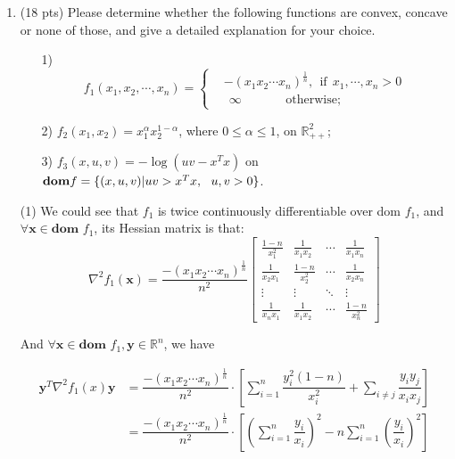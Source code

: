 \documentclass[10pt]{article}
\renewcommand{\mathbf}{\boldsymbol}
\begin{document}
\begin{enumerate}
\newpage

\item {\color{red} (18 pts)} Please determine whether the following functions are convex, concave or none of those, and give a detailed explanation for your choice.
\begin{itemize}
    \item[1)] 
     \begin{equation*}
     f_1(x_1,x_2,\cdots,x_n)=
      \begin{cases}
         &-(x_1x_2\cdots x_n)^{\frac{1}n},~~ \text{if}~~x_1,\cdots,x_n>0\\
         &~~\infty ~~~~~~~~~~~~~~~~\text{otherwise};\
       \end{cases}
     \end{equation*}
    \item[2)] $f_2(x_1,x_2)= x_1^\alpha x_2^{1-\alpha}$, where $0\leq\alpha\leq1$, on $\mathbb{R}_{++}^2$;
    \item[3)] $f_3(x,u,v)=-\log(uv-x^Tx)$ on ${\bf dom} f =\{(x,u,v)|uv>x^Tx,~~u,v>0\}$.
\end{itemize}


(1) We could see that $f_1$ is twice continuously differentiable over dom $f_1$, and $\forall\mathbf{x}\in\textbf{dom } f_1$, its Hessian matrix is that:
$$
\nabla^2 f_1(\mathbf{x})=\dfrac{-(x_1x_2\cdots x_n)^{\frac{1}{n}}}{n^2}\left[\begin{array}{cccc}
\frac{1-n}{x_1^2} & \frac{1}{x_1 x_2} & \cdots & \frac{1}{x_1 x_n} \\
\frac{1}{x_2 x_1} & \frac{1-n}{x_2^2} & \cdots & \frac{1}{x_2 x_n} \\
\vdots & \vdots & \ddots & \vdots \\
\frac{1}{x_n x_1} & \frac{1}{x_1 x_2} & \cdots & \frac{1-n}{x_n^2}
\end{array}\right]
$$

And $\forall \mathbf{x}\in\textbf{dom } f_1,\mathbf{y}\in\mathbb{R}^n$, we have

\begin{align*}
    \mathbf{y}^T\nabla^2 f_1(x)\mathbf{y} &= \dfrac{-(x_1x_2\cdots x_n)^{\frac{1}{n}}}{n^2}\cdot \left[\sum_{i=1}^n\dfrac{y_i^2(1-n)}{x_i^2}+\sum_{i\neq j}\dfrac{y_iy_j}{x_ix_j}\right] \\
    &= \dfrac{-(x_1x_2\cdots x_n)^{\frac{1}{n}}}{n^2}\cdot \left[\left(\sum_{i=1}^n\dfrac{y_i}{x_i}\right)^2-n\sum_{i=1}^n\left(\dfrac{y_i}{x_i}\right)^2\right]
\end{align*}


\end{enumerate}
\end{document}
